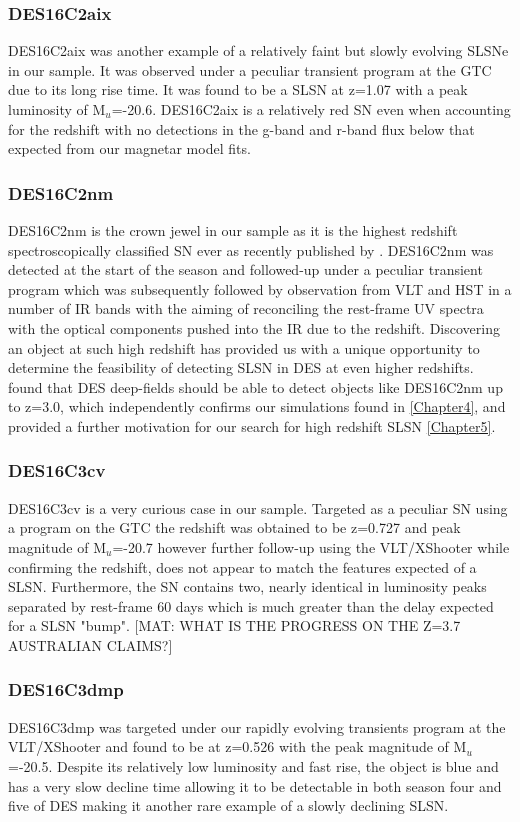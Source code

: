 \subsubsection{DES16C2aix}
DES16C2aix was another example of a relatively faint but slowly evolving SLSNe in our sample. It was observed under a peculiar transient program at the GTC due to its long rise time. It was found to be a SLSN at z=1.07 with a peak luminosity of M$_u$=-20.6. DES16C2aix is a relatively red SN even when accounting for the redshift with no detections in the g-band and r-band flux below that expected from our magnetar model fits.

\subsubsection{DES16C2nm}
DES16C2nm is the crown jewel in our sample as it is the highest redshift spectroscopically classified SN ever as recently published by \citet{Smith2018}. DES16C2nm was detected at the start of the season and followed-up under a peculiar transient program which was subsequently followed by observation from VLT and HST in a number of IR bands with the aiming of reconciling the rest-frame UV spectra with the optical components pushed into the IR due to the redshift. Discovering an object at such high redshift has provided us with a unique opportunity to determine the feasibility of detecting SLSN in DES at even higher redshifts. \citet{Smith2018} found that DES deep-fields should be able to detect objects like DES16C2nm up to z=3.0, which independently confirms our simulations found in \cref{Chapter4}, and provided a further motivation for our search for high redshift SLSN \cref{Chapter5}.

\subsubsection{DES16C3cv}
DES16C3cv is a very curious case in our sample. Targeted as a peculiar SN using a program on the GTC the redshift was obtained to be z=0.727 and peak magnitude of M$_u$=-20.7 however further follow-up using the VLT/XShooter while confirming the redshift, does not appear to match the features expected of a SLSN. Furthermore, the SN contains two, nearly identical in luminosity peaks separated by rest-frame 60 days which is much greater than the delay expected for a SLSN "bump". [MAT: WHAT IS THE PROGRESS ON THE Z=3.7 AUSTRALIAN CLAIMS?]

\subsubsection{DES16C3dmp}
DES16C3dmp was targeted under our rapidly evolving transients program at the VLT/XShooter and found to be at z=0.526 with the peak magnitude of M$_u$=-20.5. Despite its relatively low luminosity and fast rise, the object is blue and has a very slow decline time allowing it to be detectable in both season four and five of DES making it another rare example of a slowly declining SLSN.

